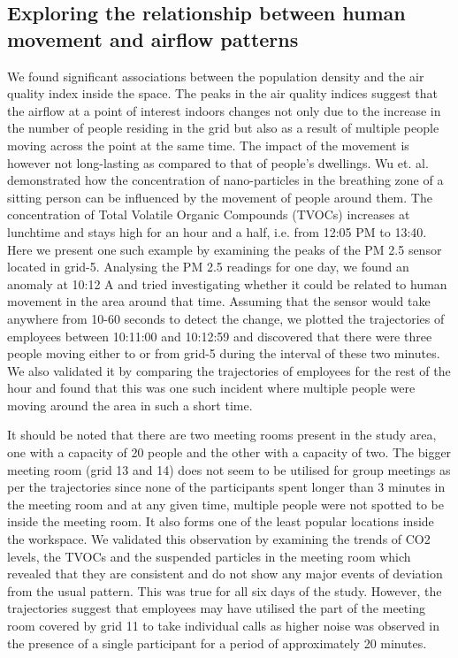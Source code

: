\documentclass[acmtog]{acmart}
\begin{document}
\subsection{Exploring the relationship between human movement and airflow patterns}
We found significant associations between the population density and the air quality index inside the space. The peaks in the air quality indices suggest that the airflow at a point of interest indoors changes not only due to the increase in the number of people residing in the grid but also as a result of multiple people moving across the point at the same time. The impact of the movement is however not long-lasting as compared to that of people's dwellings. Wu et. al. demonstrated how the concentration of nano-particles in the breathing zone of a sitting person can be influenced by the movement of people around them. The concentration of Total Volatile Organic Compounds (TVOCs) increases at lunchtime and stays high for an hour and a half, i.e. from 12:05 PM to 13:40. 
Here we present one such example by examining the peaks of the PM 2.5 sensor located in grid-5. Analysing the PM 2.5 readings for one day, we found an anomaly at 10:12 A and tried investigating whether it could be related to human movement in the area around that time. Assuming that the sensor would take anywhere from 10-60 seconds to detect the change, we plotted the trajectories of employees between 10:11:00 and 10:12:59 and discovered that there were three people moving either to or from grid-5 during the interval of these two minutes. We also validated it by comparing the trajectories of employees for the rest of the hour and found that this was one such incident where multiple people were moving around the area in such a short time. 

It should be noted that there are two meeting rooms present in the study area, one with a capacity of 20 people and the other with a capacity of two. The bigger meeting room (grid 13 and 14) does not seem to be utilised for group meetings as per the trajectories since none of the participants spent longer than 3 minutes in the meeting room and at any given time, multiple people were not spotted to be inside the meeting room. It also forms one of the least popular locations inside the workspace. We validated this observation by examining the trends of CO2 levels, the TVOCs and the suspended particles in the meeting room which revealed that they are consistent and do not show any major events of deviation from the usual pattern. This was true for all six days of the study. However, the trajectories suggest that employees may have utilised the part of the meeting room covered by grid 11 to take individual calls as higher noise was observed in the presence of a single participant for a period of approximately 20 minutes.
\end{document}
